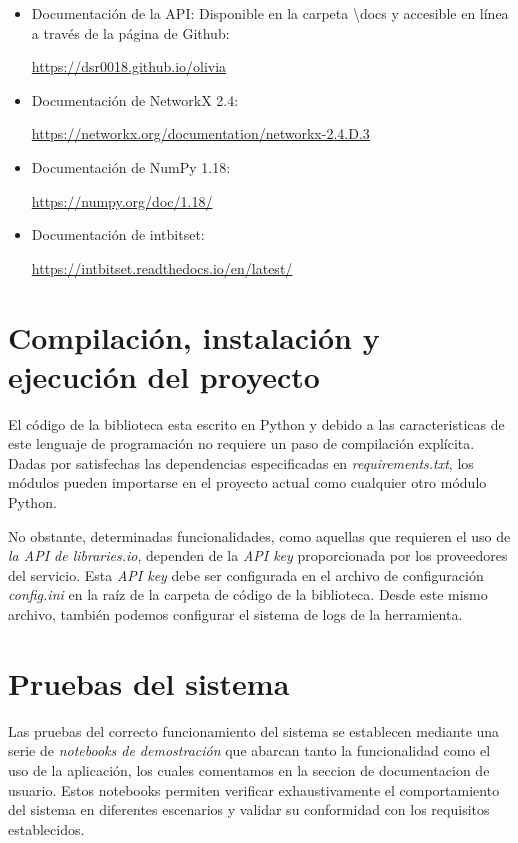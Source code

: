 \begin{itemize}
\item Documentación de la API: Disponible en la carpeta \textbackslash docs y accesible en línea a través de la página de Github: 

\url{https://dsr0018.github.io/olivia}
\item Documentación de NetworkX 2.4: 

\url{https://networkx.org/documentation/networkx-2.4.D.3}
\item Documentación de NumPy 1.18: 

\url{https://numpy.org/doc/1.18/}
\item Documentación de intbitset: 

\url{https://intbitset.readthedocs.io/en/latest/}
\end{itemize}

\section{Compilación, instalación y ejecución del proyecto}

El código de la biblioteca esta escrito en Python y debido a las caracteristicas de este lenguaje de programación
no requiere un paso de compilación explícita. Dadas por 
satisfechas las dependencias especificadas en \textit{requirements.txt}, los módulos pueden importarse 
en el proyecto actual como cualquier otro módulo Python.

No obstante, determinadas funcionalidades, como aquellas que requieren el uso de \textit{la API de libraries.io}, 
dependen de la \textit{API key} proporcionada por los proveedores del servicio. Esta \textit{API key} 
debe ser configurada en el archivo de configuración \textit{config.ini} en la raíz de la carpeta de 
código de la biblioteca. Desde este mismo archivo, también podemos configurar el sistema de logs de 
la herramienta.

\section{Pruebas del sistema}

Las pruebas del correcto funcionamiento del sistema se establecen mediante una serie de \textit{notebooks de demostración} 
que abarcan tanto la funcionalidad como el uso de la aplicación, los cuales comentamos en la seccion de documentacion de usuario. Estos notebooks permiten verificar exhaustivamente el 
comportamiento del sistema en diferentes escenarios y validar su conformidad con los requisitos establecidos.

